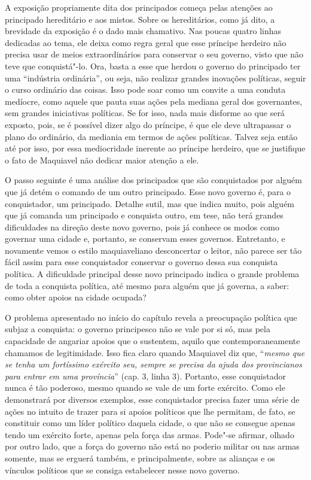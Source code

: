 A exposição propriamente dita dos principados começa pelas atenções ao
principado hereditário e aos mistos. Sobre os hereditários, como já
dito, a brevidade da exposição é o dado mais chamativo. Nas poucas
quatro linhas dedicadas ao tema, ele deixa como regra geral que esse
príncipe herdeiro não precisa usar de meios extraordinários para
conservar o seu governo, visto que não teve que conquistá"-lo. Ora, basta
a esse que herdou o governo do principado ter uma ``indústria
ordinária'', ou seja, não realizar grandes inovações políticas, seguir o
curso ordinário das coisas. Isso pode soar como um convite a uma conduta
medíocre, como aquele que pauta suas ações pela mediana geral dos
governantes, sem grandes iniciativas políticas. Se for isso, nada mais
disforme ao que será exposto, pois, se é possível dizer algo do
príncipe, é que ele deve ultrapassar o plano do ordinário, da mediania
em termos de ações políticas. Talvez seja então até por isso, por essa
mediocridade inerente ao príncipe herdeiro, que se justifique o fato de
Maquiavel não dedicar maior atenção a ele.

O passo seguinte é uma análise dos principados que são conquistados por
alguém que já detém o comando de um outro principado. Esse novo governo
é, para o conquistador, um principado. Detalhe sutil, mas que indica
muito, pois alguém que já comanda um principado e conquista outro, em
tese, não terá grandes dificuldades na direção deste novo governo, pois
já conhece os modos como governar uma cidade e, portanto, se conservam
esses governos. Entretanto, e novamente vemos o estilo maquiaveliano
desconcertar o leitor, não parece ser tão fácil assim para esse
conquistador conservar o governo dessa sua conquista política. A
dificuldade principal desse novo principado indica o grande problema de
toda a conquista política, até mesmo para alguém que já governa, a
saber: como obter apoios na cidade ocupada?

O problema apresentado no início do capítulo  revela a preocupação
política que subjaz a conquista: o governo principesco não se vale por
si só, mas pela capacidade de angariar apoios que o sustentem, aquilo
que contemporaneamente chamamos de legitimidade. Isso fica claro quando
Maquiavel diz que, ``\emph{mesmo que se tenha um fortíssimo exército
seu, sempre se precisa da ajuda dos provincianos para entrar em uma
província}'' (cap. 3, linha 3). Portanto, esse conquistador nunca é tão
poderoso, mesmo quando se vale de um forte exército. Como ele
demonstrará por diversos exemplos, esse conquistador precisa fazer uma
série de ações no intuito de trazer para si apoios políticos que lhe
permitam, de fato, se constituir como um líder político daquela cidade,
o que não se consegue apenas tendo um exército forte, apenas pela força
das armas. Pode"-se afirmar, olhado por outro lado, que a força do
governo não está no poderio militar ou nas armas somente, mas se erguerá
também, e principalmente, sobre as alianças e os vínculos políticos que
se consiga estabelecer nesse novo governo.


